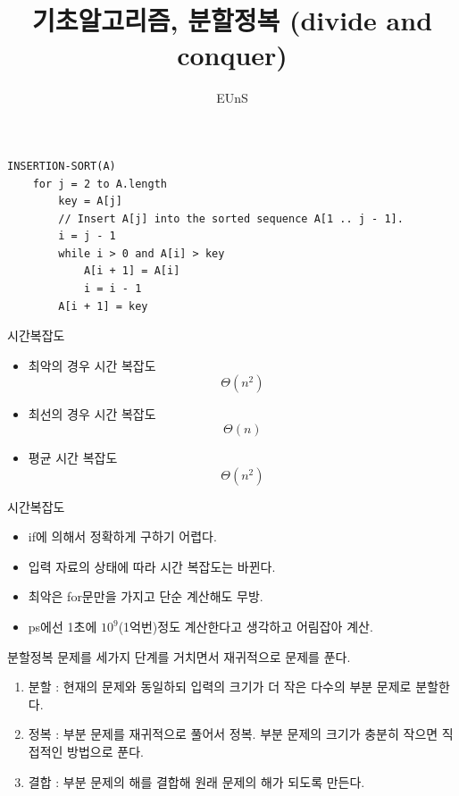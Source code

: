 \documentclass[10pt]{beamer}
\title{기초알고리즘, 분할정복 (divide and conquer)}
\author{EUnS}
\begin{document}
\begin{frame}{}
    \maketitle
\end{frame}    



\begin{frame}[fragile]{}
    \begin{lstlisting}[style = CppStyle]
    INSERTION-SORT(A)
    for j = 2 to A.length
        key = A[j]
        // Insert A[j] into the sorted sequence A[1 .. j - 1].
        i = j - 1
        while i > 0 and A[i] > key
            A[i + 1] = A[i]
            i = i - 1
        A[i + 1] = key
    \end{lstlisting}
\end{frame}


\begin{frame}{시간복잡도}
    \begin{itemize}
        \item 최악의 경우 시간 복잡도 
        $$\Theta(n^2)$$
        \item 최선의 경우 시간 복잡도 
        $$\Theta(n)$$
        \item 평균 시간 복잡도 
        $$\Theta(n^2)$$
    \end{itemize}
\end{frame}




\begin{frame}{시간복잡도}
    \begin{itemize}
        \item if에 의해서 정확하게 구하기 어렵다.
        \item 입력 자료의 상태에 따라 시간 복잡도는 바뀐다.
        \item 최악은 for문만을 가지고 단순 계산해도 무방.
        \item ps에선 1초에 $10^9$(1억번)정도 계산한다고 생각하고 어림잡아 계산.
    \end{itemize}
\end{frame}




\begin{frame}{분할정복}
    문제를 세가지 단계를 거치면서 재귀적으로 문제를 푼다.
    \begin{enumerate}
        \item 분할 : 현재의 문제와 동일하되 입력의 크기가 더 작은 다수의 부분 문제로 분할한다.
        \item 정복 : 부분 문제를 재귀적으로 풀어서 정복. 부분 문제의 크기가 충분히 작으면 직접적인 방법으로 푼다.
        \item 결합 : 부분 문제의 해를 결합해 원래 문제의 해가 되도록 만든다.
    \end{enumerate}
\end{frame}
\end{document}

